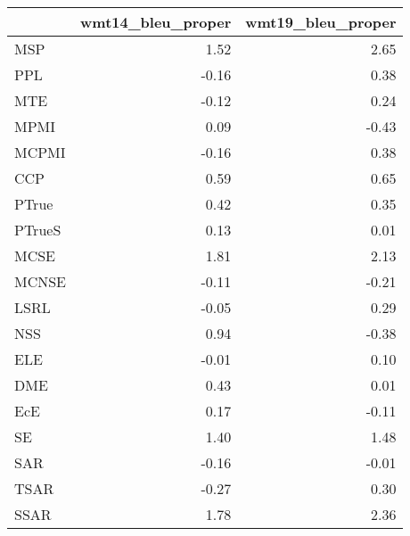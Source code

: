 \begin{tabular}{lrr}
\toprule
 & wmt14\_bleu\_proper & wmt19\_bleu\_proper \\
\midrule
MSP & 1.52 & 2.65 \\
PPL & -0.16 & 0.38 \\
MTE & -0.12 & 0.24 \\
MPMI & 0.09 & -0.43 \\
MCPMI & -0.16 & 0.38 \\
CCP & 0.59 & 0.65 \\
PTrue & 0.42 & 0.35 \\
PTrueS & 0.13 & 0.01 \\
MCSE & 1.81 & 2.13 \\
MCNSE & -0.11 & -0.21 \\
LSRL & -0.05 & 0.29 \\
NSS & 0.94 & -0.38 \\
ELE & -0.01 & 0.10 \\
DME & 0.43 & 0.01 \\
EcE & 0.17 & -0.11 \\
SE & 1.40 & 1.48 \\
SAR & -0.16 & -0.01 \\
TSAR & -0.27 & 0.30 \\
SSAR & 1.78 & 2.36 \\
\bottomrule
\end{tabular}
